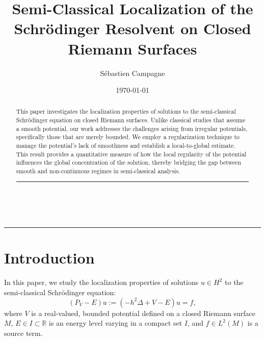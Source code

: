 \documentclass[leqno,11pt,letterpaper, english]{amsart}
\title[Semi-classical localization of the Schrödinger Resolvent]{Semi-Classical Localization of the Schrödinger Resolvent on Closed Riemann Surfaces}
\author[S.~Campagne]{Sébastien Campagne}
\date{\today}
\theoremstyle{plain}
\theoremstyle{definition}
\numberwithin{equation}{section}
\def\R{\mathbb R}
\begin{document}
    

\begin{abstract}
This paper investigates the localization properties of solutions to the semi-classical Schr\"odinger equation on closed Riemann surfaces.
Unlike classical studies that assume a smooth potential, our work addresses the challenges arising from irregular potentials, specifically those that are merely bounded.
We employ a regularization technique to manage the potential's lack of smoothness and establish a local-to-global estimate.
This result provides a quantitative measure of how the local regularity of the potential influences the global concentration of the solution, thereby bridging the gap between smooth and non-continuous regimes in semi-classical analysis.
\begin{center} \rule{0.6\textwidth}{.4pt} \end{center}
\end{abstract}   


\ \vskip -1cm \noindent\hfil\rule{0.9\textwidth}{.4pt}\hfil \vskip 1cm 
\maketitle

\section{Introduction}
In this paper, we study the localization properties of solutions \( u \in H^2 \) to the semi-classical Schr\"odinger equation:
\begin{equation}
    (P_V - E)u := (-h^2\Delta + V - E)u = f, 
\end{equation}
where \( V \) is a real-valued, bounded potential defined on a closed Riemann surface \( M \), \( E \in I \subset \mathbb{R} \) is an energy level varying in a compact set \( I \), and \( f \in L^2(M) \) is a source term. 
\end{document}
